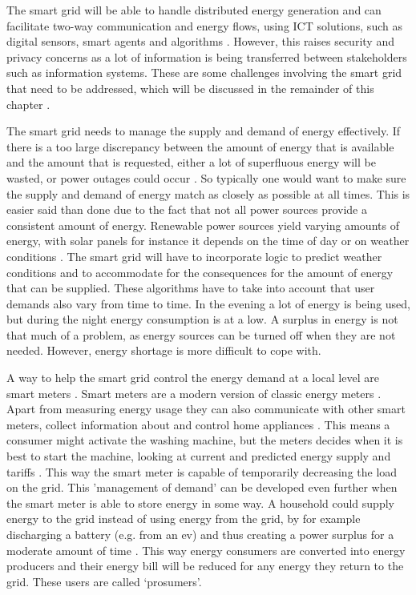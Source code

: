 The smart grid will be able to handle distributed energy generation and can facilitate two-way communication and energy flows, using ICT solutions, such as digital sensors, smart agents and algorithms . However, this raises security and privacy concerns as a lot of information is being transferred between stakeholders such as information systems. These are some challenges involving the smart grid that need to be addressed, which will be discussed in the remainder of this chapter .

The smart grid needs to manage the supply and demand of energy effectively. If there is a too large discrepancy between the amount of energy that is available and the amount that is requested, either a lot of superfluous energy will be wasted, or power outages could occur . So typically one would want to make sure the supply and demand of energy match as closely as possible at all times. This is easier said than done due to the fact that not all power sources provide a consistent amount of energy. Renewable power sources yield varying amounts of energy, with solar panels for instance it depends on the time of day or on weather conditions \cite{RamchurnVitelingumRogersJennings2014}. The smart grid will have to incorporate logic to predict weather conditions and to accommodate for the consequences for the amount of energy that can be supplied. These algorithms have to take into account that user demands also vary from time to time. In the evening a lot of energy is being used, but during the night energy consumption is at a low. A surplus in energy is not that much of a problem, as energy sources can be turned off when they are not needed. However, energy shortage is more difficult to cope with.

A way to help the smart grid control the energy demand at a local level are smart meters . Smart meters are a modern version of classic energy meters . Apart from measuring energy usage they can also communicate with other smart meters, collect information about and control home appliances . This means a consumer might activate the washing machine, but the meters decides when it is best to start the machine, looking at current and predicted energy supply and tariffs  \cite{DepuruWangDevabhaktuni2011a}. This way the smart meter is capable of temporarily decreasing the load on the grid. This 'management of demand' can be developed even further when the smart meter is able to store energy in some way. A household could supply energy to the grid instead of using energy from the grid, by for example discharging a battery (e.g. from an \ac{ev}) and thus creating a power surplus for a moderate amount of time \cite{MwasiluJustoKimEtAl2014}. This way energy consumers are converted into energy producers and their energy bill will be reduced for any energy they return to the grid. These users are called `prosumers'.

